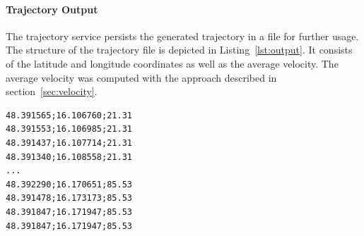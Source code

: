 \paragraph{Trajectory Output}
The trajectory service persists the generated trajectory in a file for further usage. The structure of the trajectory file is depicted in Listing~\ref{lst:output}. It consists of the latitude and longitude coordinates as well as the average velocity. The average velocity was computed with the approach described in section~\ref{sec:velocity}.
\begin{lstlisting}[style=BashInputStyle,caption={Coverage prediction},label={lst:output}]
48.391565;16.106760;21.31
48.391553;16.106985;21.31             
48.391437;16.107714;21.31
48.391340;16.108558;21.31
...
48.392290;16.170651;85.53
48.391478;16.173173;85.53
48.391847;16.171947;85.53
48.391847;16.171947;85.53
\end{lstlisting}


